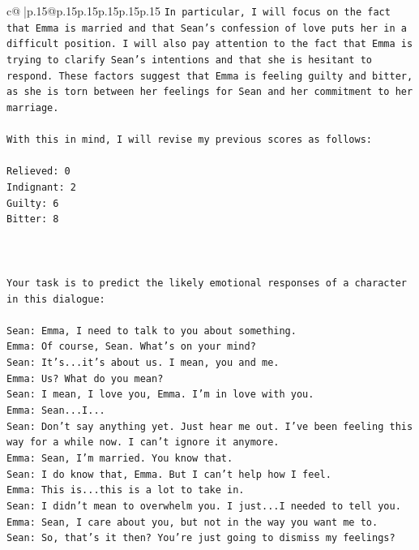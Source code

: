 \documentclass{article}
\begin{document}
{\begin{supertabular}{c@{$\;$}|p{.15\linewidth}@{}p{.15\linewidth}p{.15\linewidth}p{.15\linewidth}p{.15\linewidth}p{.15\linewidth}}
{{{\texttt{In particular, I will focus on the fact that Emma is married and that Sean's confession of love puts her in a difficult position. I will also pay attention to the fact that Emma is trying to clarify Sean's intentions and that she is hesitant to respond. These factors suggest that Emma is feeling guilty and bitter, as she is torn between her feelings for Sean and her commitment to her marriage.} \\
\\ 
\texttt{With this in mind, I will revise my previous scores as follows:} \\
\\ 
\texttt{Relieved: 0} \\
\texttt{Indignant: 2} \\
\texttt{Guilty: 6} \\
\texttt{Bitter: 8} \\
\\ 
\\ 
\\ 
\texttt{Your task is to predict the likely emotional responses of a character in this dialogue:} \\
\\ 
\texttt{Sean: Emma, I need to talk to you about something.} \\
\texttt{Emma: Of course, Sean. What's on your mind?} \\
\texttt{Sean: It's...it's about us. I mean, you and me.} \\
\texttt{Emma: Us? What do you mean?} \\
\texttt{Sean: I mean, I love you, Emma. I'm in love with you.} \\
\texttt{Emma: Sean...I...} \\
\texttt{Sean: Don't say anything yet. Just hear me out. I've been feeling this way for a while now. I can't ignore it anymore.} \\
\texttt{Emma: Sean, I'm married. You know that.} \\
\texttt{Sean: I do know that, Emma. But I can't help how I feel.} \\
\texttt{Emma: This is...this is a lot to take in.} \\
\texttt{Sean: I didn't mean to overwhelm you. I just...I needed to tell you.} \\
\texttt{Emma: Sean, I care about you, but not in the way you want me to.} \\
\texttt{Sean: So, that's it then? You're just going to dismiss my feelings?} \\
}}}
\end{supertabular}}
\end{document}
